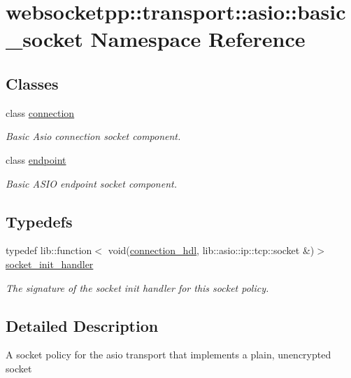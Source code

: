 \hypertarget{namespacewebsocketpp_1_1transport_1_1asio_1_1basic__socket}{}\section{websocketpp\+:\+:transport\+:\+:asio\+:\+:basic\+\_\+socket Namespace Reference}
\label{namespacewebsocketpp_1_1transport_1_1asio_1_1basic__socket}
\subsection*{Classes}
\begin{DoxyCompactItemize}
\item 
class \hyperlink{classwebsocketpp_1_1transport_1_1asio_1_1basic__socket_1_1connection}{connection}
\begin{DoxyCompactList}\small\item\em Basic Asio connection socket component. \end{DoxyCompactList}\item 
class \hyperlink{classwebsocketpp_1_1transport_1_1asio_1_1basic__socket_1_1endpoint}{endpoint}
\begin{DoxyCompactList}\small\item\em Basic A\+S\+I\+O endpoint socket component. \end{DoxyCompactList}\end{DoxyCompactItemize}
\subsection*{Typedefs}
\begin{DoxyCompactItemize}
\item 
typedef lib\+::function$<$ void(\hyperlink{namespacewebsocketpp_a6b3d26a10ee7229b84b776786332631d}{connection\+\_\+hdl}, lib\+::asio\+::ip\+::tcp\+::socket \&)$>$ \hyperlink{namespacewebsocketpp_1_1transport_1_1asio_1_1basic__socket_a88f9c59fa40db3188769162db98edb93}{socket\+\_\+init\+\_\+handler}
\begin{DoxyCompactList}\small\item\em The signature of the socket init handler for this socket policy. \end{DoxyCompactList}\end{DoxyCompactItemize}


\subsection{Detailed Description}
A socket policy for the asio transport that implements a plain, unencrypted socket 

